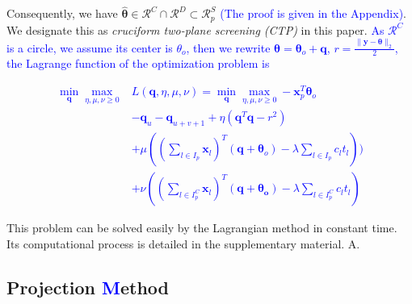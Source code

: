 \documentclass[twoside]{article}
\theoremstyle{plain}
\renewcommand{\vec}[1]{\bm{#1}}
\newcommand{\changeXS}[1]{\textcolor{blue}{#1}}
\begin{document}
Consequently, we have $\hat{\vec{\theta}}  \in \mathcal{R}^{C}\cap\mathcal{R}^{D} \subset \mathcal{R}^{S}_{p}$ \changeXS{(The proof is given in the Appendix)}.
We designate this as {\it cruciform two-plane screening (CTP)} in this paper. \changeXS{As $\mathcal{R}^{C}$ is a circle, we assume its center is $\theta_o$, then we rewrite $\vec \theta = \vec \theta_o + \vec q$, $r = \frac{\|\vec y - \vec \theta\|_2}{2}$, the Lagrange function of the optimization problem is  } 

\changeXS{
\begin{equation}
\begin{split}
\min_{\vec{q}} \max_{\eta,\mu,\nu \geq 0} &L(\vec{q},\eta,\mu,\nu) =\min_{\vec{q}}\max_{\eta,\mu,\nu\geq0} - \vec x_p^{T}\vec \theta_o \\
&- \vec{q}_{u} - \vec{q}_{u+v+1} + \eta( \vec{q}^T\vec{q} - r^2)\\
&+\mu( (\sum_{l\in I_p}\vec{x}_{l})^T(\vec{q}+\vec\theta_o) -  \lambda\sum_{l\in I_p}c_lt_l)) \\
&+ \nu( (\sum_{l\in I^{C}_p}\vec{x}_{l})^T(\vec{q}+\vec{\theta_o}) -\lambda\sum_{l\in I^{C}_p}c_lt_l)
\end{split}
\end{equation}}


This problem can be solved easily by the Lagrangian method in constant time. Its computational process is detailed in the supplementary material. A.

\subsection{Projection \changeXS{M}ethod}
\end{document}
